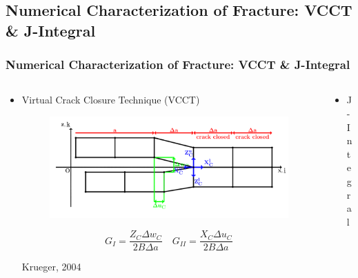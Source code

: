 \documentclass[first,firstsupp,lastsupp,last,hyperref,table]{ETHclass}
\begin{document}
\subsection[Numerical Characterization of Fracture]{Numerical Characterization of Fracture: VCCT \& J-Integral}

\begin{frame}
\frametitle{\vspace{0.3cm} \scriptsize Numerical Characterization of Fracture: VCCT \& J-Integral}
\vspace{-0.4cm}
\centering
\scriptsize
\begin{columns}
\begin{column}{0.5\textwidth}
\centering
\vspace*{-1.4cm}
\begin{itemize}[label=]
\item Virtual Crack Closure Technique (VCCT)
\begin{figure}
\includegraphics[width=\columnwidth]{VCCT.pdf}
  \label{fig:vcct}
\end{figure}

\begin{equation*}
G_{I}=\frac{Z_{C}\Delta w_{C}}{2B\Delta a}\quad G_{II}=\frac{X_{C}\Delta u_{C}}{2B\Delta a}
\end{equation*}

Krueger, 2004
\end{itemize}
\end{column}
\begin{column}{0.5\textwidth}
\centering
\begin{itemize}[label=]
\item J-Integral


\end{itemize}
\end{column}
\end{columns}
\end{frame}
\end{document}
